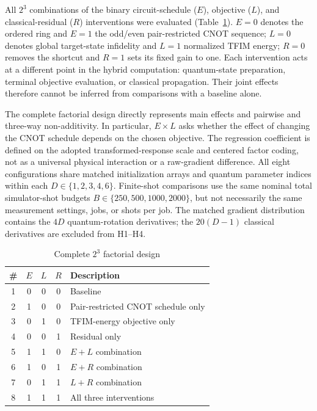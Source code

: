 \documentclass[pdflatex,sn-mathphys-num,Numbered]{sn-jnl}
\begin{document}
All $2^3$ combinations of the binary circuit-schedule ($E$), objective ($L$), and classical-residual ($R$) interventions were evaluated (Table~\ref{tab:configurations}). $E=0$ denotes the ordered ring and $E=1$ the odd/even pair-restricted CNOT sequence; $L=0$ denotes global target-state infidelity and $L=1$ normalized TFIM energy; $R=0$ removes the shortcut and $R=1$ sets its fixed gain to one. Each intervention acts at a different point in the hybrid computation: quantum-state preparation, terminal objective evaluation, or classical propagation. Their joint effects therefore cannot be inferred from comparisons with a baseline alone.

The complete factorial design directly represents main effects and pairwise and three-way non-additivity. In particular, $E\times L$ asks whether the effect of changing the CNOT schedule depends on the chosen objective. The regression coefficient is defined on the adopted transformed-response scale and centered factor coding, not as a universal physical interaction or a raw-gradient difference. All eight configurations share matched initialization arrays and quantum parameter indices within each $D\in\{1,2,3,4,6\}$. Finite-shot comparisons use the same nominal total simulator-shot budgets $B\in\{250,500,1000,2000\}$, but not necessarily the same measurement settings, jobs, or shots per job. The matched gradient distribution contains the $4D$ quantum-rotation derivatives; the $20(D-1)$ classical derivatives are excluded from H1--H4.

\begin{table}[t]
\centering
\begin{tabular}{cccc l}
\toprule
\# & $E$ & $L$ & $R$ & Description \\
\midrule
1 & 0 & 0 & 0 & Baseline \\
2 & 1 & 0 & 0 & Pair-restricted CNOT schedule only \\
3 & 0 & 1 & 0 & TFIM-energy objective only \\
4 & 0 & 0 & 1 & Residual only \\
5 & 1 & 1 & 0 & $E+L$ combination \\
6 & 1 & 0 & 1 & $E+R$ combination \\
7 & 0 & 1 & 1 & $L+R$ combination \\
8 & 1 & 1 & 1 & All three interventions \\
\bottomrule
\end{tabular}
\caption{Complete $2^3$ factorial design}
\label{tab:configurations}
\end{table}
\end{document}
